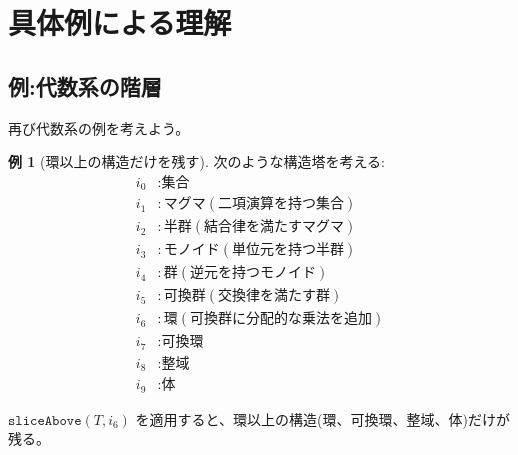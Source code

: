 \documentclass[a4paper,11pt]{article}
\theoremstyle{definition}
\newtheorem{example}[definition]{例}
\begin{document}
\section{具体例による理解}

\subsection{例:代数系の階層}

再び代数系の例を考えよう。

\begin{example}[環以上の構造だけを残す]
次のような構造塔を考える:
\begin{align*}
i_0 &: \text{集合} \\
i_1 &: \text{マグマ}(二項演算を持つ集合) \\
i_2 &: \text{半群}(結合律を満たすマグマ) \\
i_3 &: \text{モノイド}(単位元を持つ半群) \\
i_4 &: \text{群}(逆元を持つモノイド) \\
i_5 &: \text{可換群}(交換律を満たす群) \\
i_6 &: \text{環}(可換群に分配的な乗法を追加) \\
i_7 &: \text{可換環} \\
i_8 &: \text{整域} \\
i_9 &: \text{体}
\end{align*}

$\texttt{sliceAbove}(T, i_6)$ を適用すると、環以上の構造(環、可換環、整域、体)だけが残る。
\end{example}
\end{document}

